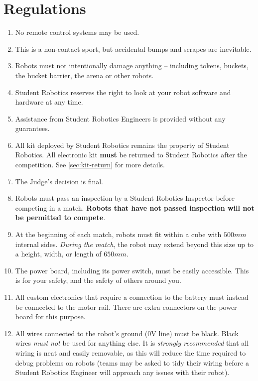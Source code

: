 \section {Regulations}
\label{sec:Regulations}

\begin{enumerate}


\item No remote control systems may be used.
\item This is a non-contact sport, but accidental bumps and scrapes are inevitable.
\item Robots must not intentionally damage anything -- including tokens, buckets, the bucket barrier, the arena or other robots.
\item Student Robotics reserves the right to look at your robot software and hardware at any time.
\item Assistance from Student Robotics Engineers is provided without any guarantees.
\item All kit deployed by Student Robotics remains the property of Student Robotics.
 All electronic kit \textbf{must} be returned to Student Robotics after the competition. See \autoref{sec:kit-return} for more details.
\item The Judge's decision is final.


\item Robots must pass an inspection by a Student Robotics Inspector before competing in a match.
 \textbf{Robots that have not passed inspection will not be permitted to compete}.

\item At the beginning of each match, robots must fit within a cube with $500mm$ internal sides.  \textit{During the match}, the robot may extend beyond this size up to a height, width, or length of $650mm$.

\item The power board, including its power switch, must be easily accessible.
 This is for your safety, and the safety of others around you.

\item All custom electronics that require a connection to the battery must instead be connected to the motor rail.
 There are extra connectors on the power board for this purpose.

\item All wires connected to the robot's ground (0V line) must be black.
 Black wires \emph{must not} be used for anything else.
 It is \emph{strongly recommended} that all wiring is neat and easily removable, as this will reduce the time required to debug problems on robots
  (teams may be asked to tidy their wiring before a Student Robotics Engineer will approach any issues with their robot).


\end{enumerate}
